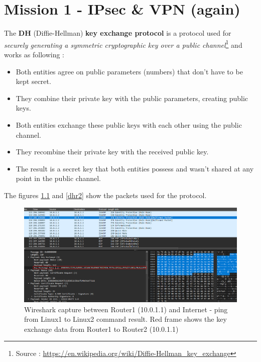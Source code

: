 \documentclass[10pt,a4paper]{ULBreport}
\begin{document}
\chapter{Mission 1 - IPsec \& VPN (again)}



The \textbf{DH} (Diffie-Hellman) \textbf{key exchange protocol} is a protocol used for \textit{securely generating a symmetric cryptographic key over a public channel}\footnote{Source : \url{https://en.wikipedia.org/wiki/Diffie-Hellman_key_exchange}} and works as following :

\begin{itemize}
    \item Both entities agree on public parameters (numbers) that don't have to be kept secret. 
    \item They combine their private key with the public parameters, creating public keys.
    \item Both entities exchange these public keys with each other using the public channel.
    \item They recombine their private key with the received public key.
    \item The result is a secret key that both entities possess and wasn't shared at any point in the public channel.
\end{itemize}

The figures \ref{dhr1} and \ref{dhr2} show the packets used for the protocol.


\begin{figure}[H]
    \centering
    \includegraphics[width=\textwidth]{wiresharkDHR1.png}
    \caption{Wireshark capture between Router1 (10.0.1.1) and Internet - ping from Linux1 to Linux2 command result. Red frame shows the key exchange data from Router1 to Router2 (10.0.1.1)}
    \label{dhr1}
\end{figure}
\end{document}

